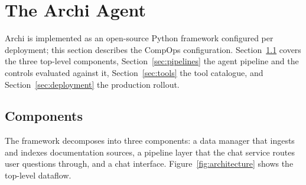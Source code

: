 \section{The Archi Agent}
\label{sec:agent}

Archi is implemented as an open-source Python framework
configured per deployment; this section describes the CompOps
configuration. Section~\ref{sec:components} covers the three
top-level components, Section~\ref{sec:pipelines} the agent
pipeline and the controls evaluated against it,
Section~\ref{sec:tools} the tool catalogue, and
Section~\ref{sec:deployment} the production rollout.

\subsection{Components}
\label{sec:components}

The framework decomposes into three components: a data manager
that ingests and indexes documentation sources, a pipeline layer
that the chat service routes user questions through, and a chat
interface. Figure~\ref{fig:architecture} shows the top-level
dataflow.

